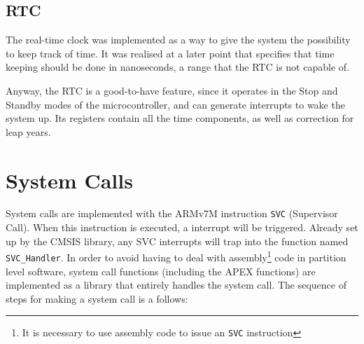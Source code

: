 \subsection{RTC}
The real-time clock was implemented as a way to give the system the
possibility to keep track of time. It was realised at a later point
that \arinc{} specifies that time keeping should be done in nanoseconds,
a range that the RTC is not capable of.

Anyway, the RTC is a good-to-have feature, since it operates in the 
Stop and Standby modes
of the microcontroller, and can generate interrupts to wake the system up.
Its registers contain all the time components, as well as correction for
leap years.


\section{System Calls}
System calls are implemented with the ARMv7M instruction \texttt{SVC} (Supervisor
Call). When this instruction is executed, a interrupt will be triggered. Already
set up by the CMSIS library, any SVC interrupts will trap into the function
named \texttt{SVC\_Handler}.
In order to avoid having to deal with assembly\footnote{It is necessary to use
assembly code to issue an \texttt{SVC} instruction} code in partition level
software, system call functions (including the APEX functions) are implemented
as a library that entirely handles the system call.
The sequence of steps for making a system call is a follows:\\

